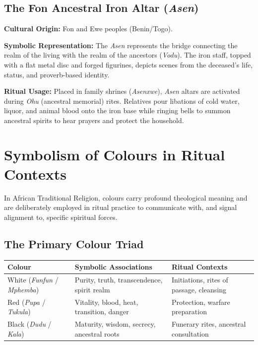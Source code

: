 \documentclass[12pt,a4paper]{article}
\begin{document}
\subsection{The Fon Ancestral Iron Altar (\textit{Asen})}

\textbf{Cultural Origin:} Fon and Ewe peoples (Benin/Togo).

\textbf{Symbolic Representation:} The \textit{Asen} represents the bridge connecting the realm of the living with the realm of the ancestors (\textit{Vodu}). The iron staff, topped with a flat metal disc and forged figurines, depicts scenes from the deceased's life, status, and proverb-based identity.

\textbf{Ritual Usage:} Placed in family shrines (\textit{Asenxwe}), \textit{Asen} altars are activated during \textit{Ohu} (ancestral memorial) rites. Relatives pour libations of cold water, liquor, and animal blood onto the iron base while ringing bells to summon ancestral spirits to hear prayers and protect the household.

\section{Symbolism of Colours in Ritual Contexts}

In African Traditional Religion, colours carry profound theological meaning and are deliberately employed in ritual practice to communicate with, and signal alignment to, specific spiritual forces.

\subsection{The Primary Colour Triad}

\begin{center}
\renewcommand{\arraystretch}{1.5}
\begin{tabular}{|l|l|l|}
\hline
\textbf{Colour} & \textbf{Symbolic Associations} & \textbf{Ritual Contexts} \\
\hline
White (\textit{Funfun} / \textit{Mphemba}) & Purity, truth, transcendence, spirit realm & Initiations, rites of passage, cleansing \\
Red (\textit{Pupa} / \textit{Tukula}) & Vitality, blood, heat, transition, danger & Protection, warfare preparation \\
Black (\textit{Dudu} / \textit{Kala}) & Maturity, wisdom, secrecy, ancestral roots & Funerary rites, ancestral consultation \\
\hline
\end{tabular}
\end{center}
\end{document}
